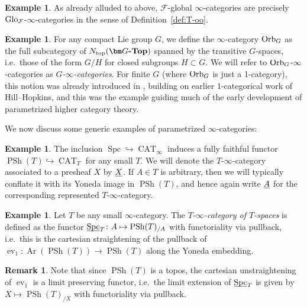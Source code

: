 \documentclass[reqno]{memo-l}
\theoremstyle{mythm}
\theoremstyle{definition}
\newtheorem{rk}[thm]{Remark}
\newtheorem{ex}[thm]{Example}
\numberwithin{equation}{section}
\newcommand{\Ff}{{\mathcal{F}}}
\DeclareMathOperator{\ev}{ev}
\DeclareMathOperator{\Spc}{Spc}
\DeclareMathOperator{\CAT}{CAT}
\DeclareMathOperator{\PSh}{PSh}
\DeclareMathOperator{\Ar}{Ar}
\newcommand{\Ntop}{{N_\textup{top}}}
\newcommand{\cat}[1]{\textbf{\textup{#1}}}
\newcommand{\Orb}{{\vphantom{\textup{t}}\smash{\textup{Orb}}}}
\newcommand{\Glo}{\textup{Glo}}
\newcommand{\ulhelper}[2]{\underline{\setbox0=\hbox{$#1#2$}\dp0=0.4pt \box0\relax}}
\newcommand{\ul}[1]{{\mathpalette\ulhelper{#1}}\hbox{\rule[-2pt]{0pt}{0pt}}}
\begin{document}
\begin{ex}
    As already alluded to above, $\Ff$-global $\infty$-categories are precisely $\Glo_\Ff$-$\infty$-categories in the sense of Definition~\ref{def:T-oo}.
\end{ex}

\begin{ex}\label{ex:G-oo}
    For any compact Lie group $G$, we define the $\infty$-category $\Orb_G$ as the full subcategory of $\Ntop(\cat{$\bm G$-Top})$ spanned by the transitive $G$-spaces, i.e.\ those of the form $G/H$ for closed subgroups $H\subset G$. We will refer to $\Orb_G$-$\infty$-categories as \emph{$G$-$\infty$-categories}. For finite $G$ (where $\Orb_G$ is just a 1-category), this notion was already introduced in \cite{exposeI}, building on earlier $1$-categorical work of Hill--Hopkins, and this was the example guiding much of the early development of parametrized higher category theory.
\end{ex}

We now discuss some generic examples of parametrized $\infty$-categories:

\begin{ex}
    The inclusion $\Spc\hookrightarrow\CAT_\infty$ induces a fully faithful functor $\PSh(T)\hookrightarrow\CAT_T$ for any small $T$. We will denote the $T$-$\infty$-category associated to a presheaf $X$ by $\ul X$. If $A\in T$ is arbitrary, then we will typically conflate it with its Yoneda image in $\PSh(T)$, and hence again write $\ul A$ for the corresponding represented $T$-$\infty$-category.
\end{ex}

\begin{ex}
    Let $T$ be any small $\infty$-category. The \emph{$T$-$\infty$-category of $T$-spaces} is defined as the functor $\ul\Spc_T\colon A\mapsto \PSh(T)_{/A}$ with functoriality via pullback, i.e.\ this is the cartesian straightening of the pullback of $\ev_1\colon\Ar(\PSh(T))\to\PSh(T)$ along the Yoneda embedding. 
\end{ex}

\begin{rk}
    Note that since $\PSh(T)$ is a topos, the cartesian unstraightening of $\ev_1$ is a limit preserving functor, i.e.~the limit extension of $\ul\Spc_T$ is given by $X\mapsto\PSh(T)_{/X}$ with functoriality via pullback.
\end{rk}
\end{document}
